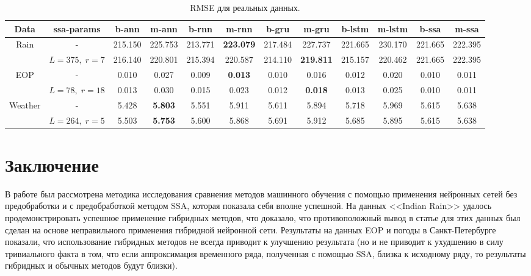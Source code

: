 \documentclass[specialist,
               substylefile = spbu.rtx,
               subf,href,colorlinks=true, 12p]{disser}
\begin{document}
\begin{landscape}
	\begin{table}[h]
		\caption{RMSE для реальных данных.}
		\small
		\begin{center}
			
			\begin{tabular}{|cc||cc|cc|cc|cc||cc|}
				\toprule
				Data & ssa-params &   b-ann &   m-ann &   b-rnn &   m-rnn &   b-gru &   m-gru &  b-lstm &  m-lstm &   b-ssa &   m-ssa \\
				\midrule
				Rain & - & 215.150 & 225.753 & 213.771 & \textbf{223.079} & 217.484 & 227.737 & 221.665 & 230.170 & 221.665 & 222.395 \\
				& $L = 375, \; r = 7$ & 216.140 & 220.801 & 215.394 & 220.587 & 214.110 & \textbf{219.811} & 215.157 & 220.462 & 221.665 & 222.395 \\
				EOP & - &   0.010 &   0.027 &   0.009 &   \textbf{0.013} &   0.010 &   0.016 &   0.012 &   0.020 &   0.010 &   0.011 \\
				& $L = 78, \; r = 18$ &   0.013 &   0.030 &   0.015 &   0.023 &   0.012 &   \textbf{0.018} &   0.013 &   0.025 &   0.010 &   0.011 \\
				Weather & - &   5.428 &   \textbf{5.803} &   5.551 &   5.911 &   5.611 &   5.894 &   5.718 &   5.969 &   5.615 &   5.638 \\
				& $L = 264, \; r = 5$ &   5.503 &   \textbf{5.753} &   5.600 &   5.868 &   5.691 &   5.912 &   5.685 &   5.895 &   5.615 &   5.638 \\
				\bottomrule
			\end{tabular}
	\end{center}
	\label{real_bigtable}
	\end{table}
\end{landscape}

\chapter*{Заключение}
В работе был рассмотрена методика исследования сравнения методов машинного обучения с помощью применения нейронных сетей без предобработки и с предобработкой методом SSA, которая показала себя вполне успешной. На данных <<Indian Rain>> удалось продемонстрировать успешное применение гибридных методов, что доказало, что противоположный вывод в статье \cite{ar1} для этих данных был сделан на основе неправильного применения гибридной нейронной сети. Результаты на данных EOP и погоды в Санкт-Петербурге показали, что использование гибридных методов не всегда приводит к улучшению результата (но и не приводит к ухудшению в силу тривиального факта в том, что если аппроксимация временного ряда, полученная с помощью SSA, близка к исходному ряду, то результаты гибридных и обычных методов будут близки).
\end{document}
